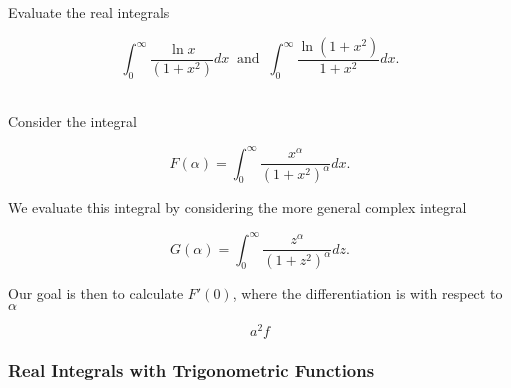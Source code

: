 \documentclass[english,a4paper,12pt]{report}
\begin{document}
{Evaluate the real integrals 

\begin{equation}
    \int_{0}^{\infty} \frac{\ln x}{(1+x^2)}dx ~\text { and }~ \int_{0}^{\infty} \frac{\ln (1+x^2)}{1+x^2}dx.     
\end{equation}
~
}
{Consider the integral 

\begin{equation}
    F(\alpha ) = \int_{0}^{\infty} \frac{x^{\alpha } }{(1+x^2)^{\alpha } }dx.   
\end{equation}

We evaluate this integral by considering the more general complex integral 

\begin{equation}
    G(\alpha ) = \int_{0}^{\infty} \frac{z^{\alpha } }{(1+z^2)^{\alpha } }dz.  
\end{equation}

Our goal is then to calculate \(F'(0)\), where the differentiation is with respect to \(\alpha \)  

\begin{equation}
    a^2f
\end{equation}




} 


\subsubsection{Real Integrals with Trigonometric Functions}
\end{document}

